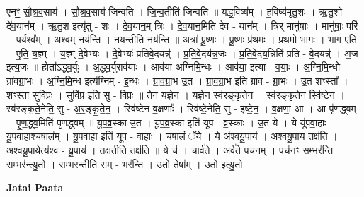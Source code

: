 \documentclass[17pt]{extarticle}
\begin{document}
ए॒नꣳ॒॒ सौ॒श्र॒व॒साय॑ । सौ॒श्र॒व॒साय॑ जिन्वति । जि॒न्व॒तीति॑ जिन्वति ॥ यद्ध॒विष्य᳚म् । ह॒विष्य॑मृतु॒शः । ऋ॒तु॒शो दे॑व॒यान᳚म् । ऋ॒तु॒श इत्यृ॑तु - शः । दे॒व॒यान॒म् त्रिः । दे॒व॒यान॒मिति॑ देव - यान᳚म् । त्रिर् मानु॑षाः । मानु॑षाः॒ परि॑ । पर्यश्व᳚म् । अश्व॒म् नय॑न्ति । नय॒न्तीति॒ नय॑न्ति ॥ अत्रा॑ पू॒ष्णः । पू॒ष्णः प्र॑थ॒मः । प्र॒थ॒मो भा॒गः । भा॒ग ए॑ति । ए॒ति॒ य॒ज्ञ्म् । य॒ज्ञ्म् दे॒वेभ्यः॑ । दे॒वेभ्यः॑ प्रतिवे॒दयन्न्॑ । प्र॒ति॒वे॒दय॑न्न॒जः । प्र॒ति॒वे॒दय॒न्निति॑ प्रति - वे॒दयन्न्॑ । अ॒ज इत्य॒जः ॥ होता᳚ऽद्ध्व॒र्युः । अ॒द्ध्व॒र्युराव॑याः । आव॑या अग्निमि॒न्धः । आव॑या॒ इत्या - व॒याः॒ । अ॒ग्नि॒मि॒न्धो ग्रा॑वग्रा॒भः । अ॒ग्नि॒मि॒न्ध इत्य॑ग्निम् - इ॒न्धः । ग्रा॒व॒ग्रा॒भ उ॒त । ग्रा॒व॒ग्रा॒भ इति॑ ग्राव - ग्रा॒भः । उ॒त शꣳस्ता᳚ । शꣳस्ता॒ सुवि॑प्रः । सुवि॑प्र॒ इति॒ सु - वि॒प्रः॒ ॥ तेन॑ य॒ज्ञेन॑ । य॒ज्ञेन॒ स्व॑रङ्कृतेन । स्व॑रङ्कृतेन॒ स्वि॑ष्टेन । स्व॑रङ्कृते॒नेति॒ सु - अ॒र॒ङ्कृ॒ते॒न॒ । स्वि॑ष्टेन व॒क्षणाः᳚ । स्वि॑ष्टे॒नेति॒ सु - इ॒ष्टे॒न॒ । व॒क्षणा॒ आ । आ पृ॑णद्ध्वम् । पृ॒ण॒द्ध्व॒मिति॑ पृणद्ध्वम् ॥ यू॒प॒व्र॒स्का उ॒त । यू॒प॒व्र॒स्का इति॑ यूप - व्र॒स्काः । उ॒त ये । ये यू॑पवा॒हाः । यू॒प॒वा॒हाश्च॒षाल᳚म् । यू॒प॒वा॒हा इति॑ यूप - वा॒हाः । च॒षालं॒ ॅये । ये अ॑श्वयू॒पाय॑ । अ॒श्व॒यू॒पाय॒ तक्ष॑ति । अ॒श्व॒यू॒पायेत्य॑श्व - यू॒पाय॑ । तक्ष॒तीति॒ तक्ष॑ति ॥ ये च॑ । चार्व॑ते । अर्व॑ते॒ पच॑नम् । पच॑नꣳ स॒म्भर॑न्ति । स॒म्भर॑न्त्यु॒तो । स॒म्भर॒न्तीति॑ सम् - भर॑न्ति । उ॒तो तेषा᳚म् । उ॒तो इत्यु॒तो \newline

\textbf{Jatai Paata} \newline
\end{document}
